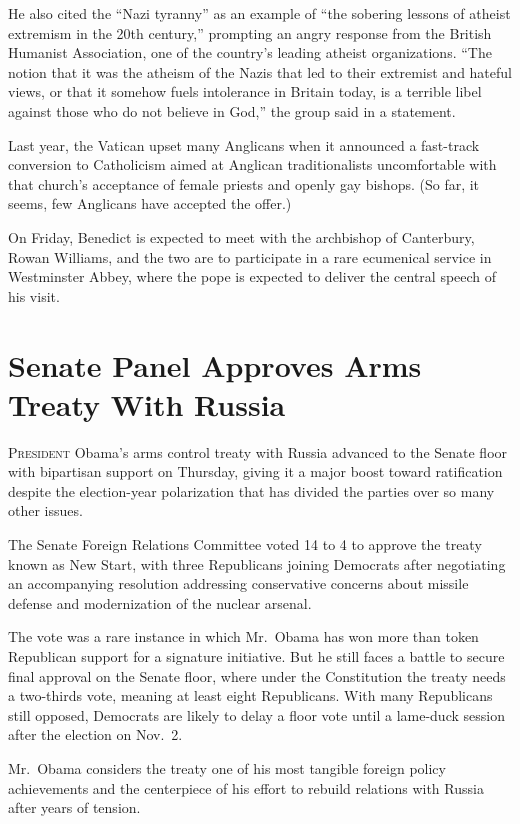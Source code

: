 ﻿\documentclass[12pt]{article}
\begin{document}
He also cited the ``Nazi tyranny'' as an example of ``the sobering lessons of atheist extremism in
the 20th century,'' prompting an angry response from the British Humanist Association, one of the
country's leading atheist organizations. ``The notion that it was the atheism of the Nazis that led
to their extremist and hateful views, or that it somehow fuels intolerance in Britain today, is a
terrible libel against those who do not believe in God,'' the group said in a statement.

Last year, the Vatican upset many Anglicans when it announced a fast-track conversion to Catholicism
aimed at Anglican traditionalists uncomfortable with that church's acceptance of female priests and
openly gay bishops. (So far, it seems, few Anglicans have accepted the offer.)

On Friday, Benedict is expected to meet with the archbishop of Canterbury, Rowan Williams, and the
two are to participate in a rare ecumenical service in Westminster Abbey, where the pope is expected
to deliver the central speech of his visit.

\pagebreak
\section{Senate Panel Approves Arms Treaty With Russia}

\lettrine{P}{resident} Obama's arms control treaty with Russia advanced to
the Senate floor with bipartisan support on Thursday, giving it a major boost toward ratification
despite the election-year polarization that has divided the parties over so many other issues.

The Senate Foreign Relations Committee voted 14 to 4 to approve the treaty known as New Start, with
three Republicans joining Democrats after negotiating an accompanying resolution addressing
conservative concerns about missile defense and modernization of the nuclear arsenal.

The vote was a rare instance in which Mr.~Obama has won more than token Republican support for a
signature initiative. But he still faces a battle to secure final approval on the Senate floor,
where under the Constitution the treaty needs a two-thirds vote, meaning at least eight Republicans.
With many Republicans still opposed, Democrats are likely to delay a floor vote until a lame-duck
session after the election on Nov.~2.

Mr.~Obama considers the treaty one of his most tangible foreign policy achievements and the
centerpiece of his effort to rebuild relations with Russia after years of tension.
\end{document}
